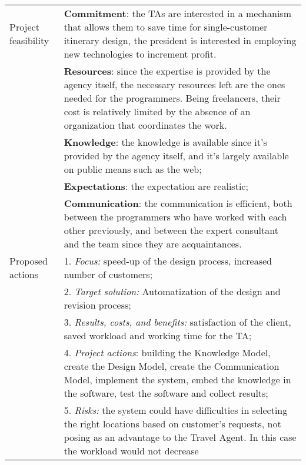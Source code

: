 \newpage
\begin{tabular}%
       {|p{3cm}%
        |p{9.5cm}|}
\hline
\sc Project feasibility
 & {\rm \textbf{Commitment}: the TAs are interested in a mechanism that allows them to save time for single-customer itinerary design, the president is interested in employing new technologies to increment profit.} \\
 & {\rm \textbf{Resources}: since the expertise is provided by the agency itself, the necessary resources left are the ones needed for the programmers. Being freelancers, their cost is relatively limited by the absence of an organization that coordinates the work.} \\
 & {\rm \textbf{Knowledge}: the knowledge is available since it's provided by the agency itself, and it's largely available on public means such as the web;} \\
 & {\rm \textbf{Expectations}: the expectation are realistic;} \\
 & {\rm \textbf{Communication}: the communication is efficient, both between the programmers who have worked with each other previously, and between the expert consultant and the team since they are acquaintances.} \\
\hline
\sc Proposed actions
 & {\rm 1. {\em Focus:} speed-up of the design process, increased number of customers;} \\
 & {\rm 2. {\em Target solution:} Automatization of the design and revision process;} \\
 & {\rm 3. {\em Results, costs, and benefits:} satisfaction of the client, saved workload and working time for the TA;} \\
 & {\rm 4. {\em Project actions}: building the Knowledge Model, create the Design Model, create the Communication Model, implement the system, embed the knowledge in the software, test the software and collect results;} \\
 & {\rm 5. {\em Risks:} the system could have difficulties in selecting the right locations based on customer's requests, not posing as an advantage to the Travel Agent. In this case the workload would not decrease} \\
\hline
\end{tabular}





